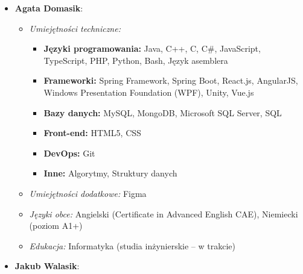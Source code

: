 \documentclass[12pt,a4paper]{book}
\begin{document}
\begin{itemize}
    \item \textbf{Agata Domasik}:
    \begin{itemize}
        \item \textit{Umiejętności techniczne:} 
        \begin{itemize}
            \item \textbf{Języki programowania:} Java, C++, C, C\#, JavaScript, TypeScript, PHP, Python, Bash, Język asemblera
            \item \textbf{Frameworki:} Spring Framework, Spring Boot, React.js, AngularJS, Windows Presentation Foundation (WPF), Unity, Vue.js
            \item \textbf{Bazy danych:} MySQL, MongoDB, Microsoft SQL Server, SQL
            \item \textbf{Front-end:} HTML5, CSS
            \item \textbf{DevOps:} Git
            \item \textbf{Inne:} Algorytmy, Struktury danych
        \end{itemize}
        \item \textit{Umiejętności dodatkowe:} Figma
        \item \textit{Języki obce:} Angielski (Certificate in Advanced English CAE), Niemiecki (poziom A1+)
        \item \textit{Edukacja:} Informatyka (studia inżynierskie – w trakcie)
    \end{itemize}
    
    \item \textbf{Jakub Walasik}:
    

\end{itemize}
\end{document}
